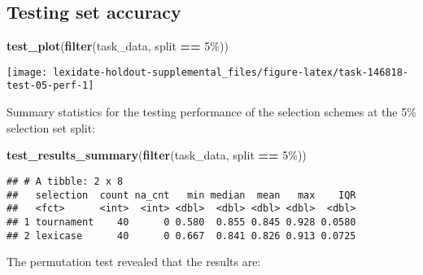 \documentclass[
]{book}
\newenvironment{Shaded}{\begin{snugshade}}{\end{snugshade}}
\newcommand{\AttributeTok}[1]{\textcolor[rgb]{0.13,0.29,0.53}{#1}}
\newcommand{\DecValTok}[1]{\textcolor[rgb]{0.00,0.00,0.81}{#1}}
\newcommand{\FunctionTok}[1]{\textcolor[rgb]{0.13,0.29,0.53}{\textbf{#1}}}
\newcommand{\NormalTok}[1]{#1}
\newcommand{\OtherTok}[1]{\textcolor[rgb]{0.56,0.35,0.01}{#1}}
\newcommand{\SpecialCharTok}[1]{\textcolor[rgb]{0.81,0.36,0.00}{\textbf{#1}}}
\newcommand{\StringTok}[1]{\textcolor[rgb]{0.31,0.60,0.02}{#1}}
\begin{document}
\hypertarget{testing-set-accuracy}{%
\subsection{Testing set accuracy}\label{testing-set-accuracy}}

\begin{Shaded}
\begin{Highlighting}[]
\FunctionTok{test\_plot}\NormalTok{(}\FunctionTok{filter}\NormalTok{(task\_data, split }\SpecialCharTok{==} \StringTok{\textquotesingle{}5\%\textquotesingle{}}\NormalTok{))}
\end{Highlighting}
\end{Shaded}

\texttt{[image: lexidate-holdout-supplemental\_files/figure-latex/task-146818-test-05-perf-1]}

Summary statistics for the testing performance of the selection schemes at the 5\% selection set split:

\begin{Shaded}
\begin{Highlighting}[]
\FunctionTok{test\_results\_summary}\NormalTok{(}\FunctionTok{filter}\NormalTok{(task\_data, split }\SpecialCharTok{==} \StringTok{\textquotesingle{}5\%\textquotesingle{}}\NormalTok{))}
\end{Highlighting}
\end{Shaded}

\begin{verbatim}
## # A tibble: 2 x 8
##   selection  count na_cnt   min median  mean   max    IQR
##   <fct>      <int>  <int> <dbl>  <dbl> <dbl> <dbl>  <dbl>
## 1 tournament    40      0 0.580  0.855 0.845 0.928 0.0580
## 2 lexicase      40      0 0.667  0.841 0.826 0.913 0.0725
\end{verbatim}

The permutation test revealed that the results are:

\begin{Shaded}
\end{Shaded}
\end{document}
